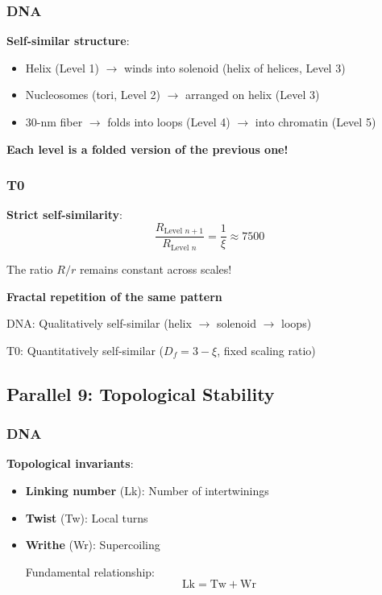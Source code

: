 	\subsubsection{DNA}
	
	\textbf{Self-similar structure}:
	\begin{itemize}
		\item Helix (Level 1) $\to$ winds into solenoid (helix of helices, Level 3)
		\item Nucleosomes (tori, Level 2) $\to$ arranged on helix (Level 3)
		\item 30-nm fiber $\to$ folds into loops (Level 4) $\to$ into chromatin (Level 5)
	\end{itemize}
	
	\textbf{Each level is a folded version of the previous one!}
	
	\subsubsection{T0}
	
	\textbf{Strict self-similarity}:
	\begin{equation}
		\frac{R_{\text{Level } n+1}}{R_{\text{Level } n}} = \frac{1}{\xi} \approx 7500
	\end{equation}
	
	The ratio $R/r$ remains constant across scales!
	
	\begin{keyresult}
		\textbf{Fractal repetition of the same pattern}
		
		DNA: Qualitatively self-similar (helix $\to$ solenoid $\to$ loops)
		
		T0: Quantitatively self-similar ($D_f = 3-\xi$, fixed scaling ratio)
	\end{keyresult}
	
	\subsection{Parallel 9: Topological Stability}
	
	\subsubsection{DNA}
	
	\textbf{Topological invariants}:
	
	\begin{itemize}
		\item \textbf{Linking number} (Lk): Number of intertwinings
		\item \textbf{Twist} (Tw): Local turns
		\item \textbf{Writhe} (Wr): Supercoiling
		
		Fundamental relationship:
		\begin{equation}
			\text{Lk} = \text{Tw} + \text{Wr}
		\end{equation}
	\end{itemize}
	
